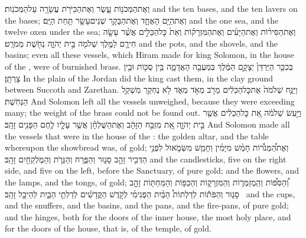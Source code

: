 {וְאֶת\maqqaf הַמְּכֹנ֖וֹת עָ֑שֶׂר וְאֶת\maqqaf הַכִּיֹּרֹ֥ת עֲשָׂרָ֖ה עַל\maqqaf הַמְּכֹנֽוֹת׃}
{and the ten bases, and the ten lavers on the bases;}
{וְאֶת\maqqaf הַיָּ֖ם הָאֶחָ֑ד וְאֶת\maqqaf הַבָּקָ֥ר שְׁנֵים\maqqaf עָשָׂ֖ר תַּ֥חַת הַיָּֽם׃}
{and the one sea, and the twelve oxen under the sea;}
{וְאֶת\maqqaf הַסִּיר֨וֹת וְאֶת\maqqaf הַיָּעִ֜ים וְאֶת\maqqaf הַמִּזְרָק֗וֹת וְאֵת֙ כׇּל\maqqaf הַכֵּלִ֣ים  אֲשֶׁ֨ר עָשָׂ֥ה חִירָ֛ם לַמֶּ֥לֶךְ שְׁלֹמֹ֖ה בֵּ֣ית יְהֹוָ֑ה נְחֹ֖שֶׁת מְמֹרָֽט׃}
{and the pots, and the shovels, and the basins; even all these vessels, which Hiram made for king Solomon, in the house of the \lord, were of burnished brass.}
{בְּכִכַּ֤ר הַיַּרְדֵּן֙ יְצָקָ֣ם הַמֶּ֔לֶךְ בְּמַעֲבֵ֖ה הָאֲדָמָ֑ה בֵּ֥ין סֻכּ֖וֹת וּבֵ֥ין צָרְתָֽן׃}
{In the plain of the Jordan did the king cast them, in the clay ground between Succoth and Zarethan.}
{וַיַּנַּ֤ח שְׁלֹמֹה֙ אֶת\maqqaf כׇּל\maqqaf הַכֵּלִ֔ים מֵרֹ֖ב מְאֹ֣ד מְאֹ֑ד לֹ֥א נֶחְקַ֖ר מִשְׁקַ֥ל הַנְּחֹֽשֶׁת׃}
{And Solomon left all the vessels unweighed, because they were exceeding many; the weight of the brass could not be found out.}
{וַיַּ֣עַשׂ שְׁלֹמֹ֔ה אֵ֚ת כׇּל\maqqaf הַכֵּלִ֔ים אֲשֶׁ֖ר בֵּ֣ית יְהֹוָ֑ה אֵ֚ת מִזְבַּ֣ח הַזָּהָ֔ב וְאֶת\maqqaf הַשֻּׁלְחָ֗ן אֲשֶׁ֥ר עָלָ֛יו לֶ֥חֶם הַפָּנִ֖ים זָהָֽב׃}
{And Solomon made all the vessels that were in the house of the \lord: the golden altar, and the table whereupon the showbread was, of gold;}
{וְאֶת\maqqaf הַ֠מְּנֹר֠וֹת חָמֵ֨שׁ מִיָּמִ֜ין וְחָמֵ֧שׁ מִשְּׂמֹ֛אול לִפְנֵ֥י הַדְּבִ֖יר זָהָ֣ב סָג֑וּר וְהַפֶּ֧רַח וְהַנֵּרֹ֛ת וְהַמֶּלְקַחַ֖יִם זָהָֽב׃}
{and the candlesticks, five on the right side, and five on the left, before the Sanctuary, of pure gold; and the flowers, and the lamps, and the tongs, of gold;}
{וְ֠הַסִּפּ֠וֹת וְהַֽמְזַמְּר֧וֹת וְהַמִּזְרָק֛וֹת וְהַכַּפּ֥וֹת וְהַמַּחְתּ֖וֹת זָהָ֣ב סָג֑וּר וְהַפֹּת֡וֹת לְדַלְתוֹת֩ הַבַּ֨יִת הַפְּנִימִ֜י לְקֹ֣דֶשׁ הַקֳּדָשִׁ֗ים לְדַלְתֵ֥י הַבַּ֛יִת לַהֵיכָ֖ל זָהָֽב׃ \petucha }
{and the cups, and the snuffers, and the basins, and the pans, and the fire-pans, of pure gold; and the hinges, both for the doors of the inner house, the most holy place, and for the doors of the house, that is, of the temple, of gold.}
\label{haft_23}
